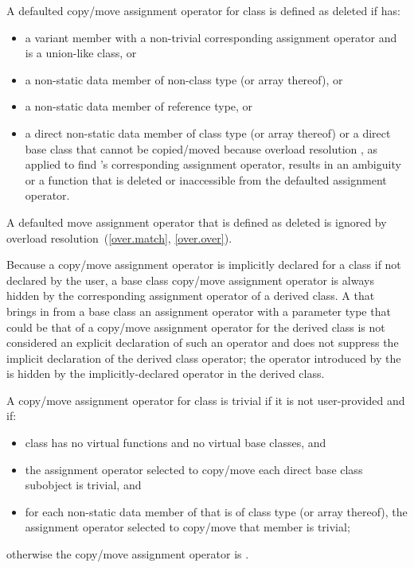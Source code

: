 \pnum
A defaulted copy/move assignment operator for
class  is defined as deleted if  has:
\begin{itemize}
\item a variant member with a non-trivial corresponding assignment operator and
   is a union-like class, or

\item a non-static data member of  non-class
  type (or array thereof), or

\item a non-static data member of reference type, or

\item a direct non-static data member of class type 
  (or array thereof) or a direct base class 
  that cannot be copied/moved because overload resolution
 , as applied to find 's corresponding
  assignment operator, results in an ambiguity or
  a function that is deleted or inaccessible from the
  defaulted assignment operator.
\end{itemize}

\begin{note}
A defaulted move assignment operator that is defined as deleted is ignored by
overload resolution~(\ref{over.match}, \ref{over.over}).
\end{note}

\pnum
{}%
%
Because a copy/move assignment operator is implicitly declared for a class
if not declared by the user,
a base class copy/move assignment operator is always hidden
by the corresponding assignment operator of a derived class.
A
 that brings in from a base class an assignment operator
with a parameter type that could be that of a
copy/move assignment operator for the
derived class is not considered an explicit declaration of such an
operator and does not suppress the implicit declaration of the derived class
operator;
the operator introduced by the
is hidden by the implicitly-declared operator in the derived
class.

\pnum
{}%
%
A copy/move assignment operator for class
is
trivial
if it is not user-provided and if:
\begin{itemize}
\item
class
has no virtual functions
and no virtual base classes, and

\item the assignment operator selected to copy/move each direct
base class subobject is trivial, and

\item
for each non-static data member of
that is of class type (or array thereof),
the assignment operator selected to copy/move that member is trivial;
\end{itemize}
%
otherwise the copy/move assignment operator is
.

